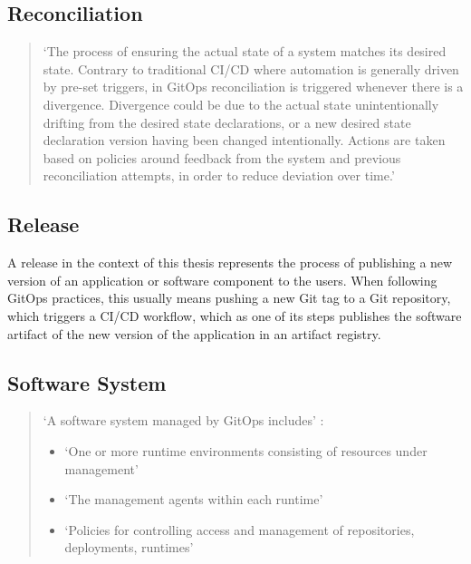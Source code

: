 \subsection*{Reconciliation}
\begin{quotation}
\noindent
\enquote*{The process of ensuring the actual state of a system matches its desired state. Contrary to traditional CI/CD where automation is generally driven by pre-set triggers, in GitOps reconciliation is triggered whenever there is a divergence. Divergence could be due to the actual state unintentionally drifting from the desired state declarations, or a new desired state declaration version having been changed intentionally. Actions are taken based on policies around feedback from the system and previous reconciliation attempts, in order to reduce deviation over time.}
\autocite{gitopsGlossary}
\end{quotation}

\subsection*{Release}

A release in the context of this thesis
represents the process of
publishing a new version of an application or software component
to the users.
When following GitOps practices,
this usually means
pushing a new Git tag to a Git repository,
which triggers a CI/CD workflow,
which as one of its steps publishes the software artifact of
the new version of the application in an artifact registry.

\subsection*{Software System}
\begin{quotation}
\noindent
\enquote*{A software system managed by GitOps includes} \autocite{gitopsGlossary}:
\begin{itemize}
	\item \enquote*{One or more runtime environments consisting of resources under management}
	\item \enquote*{The management agents within each runtime}
	\item \enquote*{Policies for controlling access and management of repositories, deployments, runtimes}
	\autocite{gitopsGlossary}
\end{itemize}
\end{quotation}

